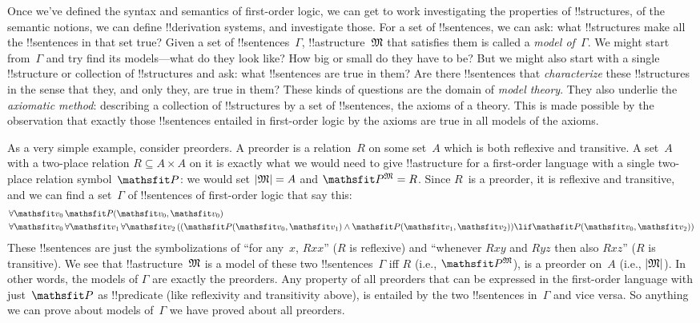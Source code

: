 \documentclass[../../../include/open-logic-section]{subfiles}
\begin{document}


Once we've defined the syntax and semantics of first-order logic, we
can get to work investigating the properties of !!{structure}s, of the
semantic notions, we can define !!{derivation} systems, and investigate those.
For a set of !!{sentence}s, we can ask: what !!{structure}s make all
the !!{sentence}s in that set true?  Given a set of
!!{sentence}s~$\Gamma$, !!a{structure}~$\Struct{M}$ that satisfies
them is called a \emph{model of~$\Gamma$}.  We might start
from~$\Gamma$ and try find its models---what do they look like? How
big or small do they have to be? But we might also start with a single
!!{structure} or collection of !!{structure}s and ask: what
!!{sentence}s are true in them?  Are there !!{sentence}s that
\emph{characterize} these !!{structure}s in the sense that they, and
only they, are true in them? These kinds of questions are the domain
of \emph{model theory}.  They also underlie the \emph{axiomatic
method}: describing a collection of !!{structure}s by a set of
!!{sentence}s, the axioms of a theory. This is made possible by the
observation that exactly those !!{sentence}s entailed in first-order
logic by the axioms are true in all models of the axioms.

As a very simple example, consider preorders. A preorder is a
relation~$R$ on some set~$A$ which is both reflexive and transitive.
A set~$A$ with a two-place relation $R \subseteq A \times A$ on it is
exactly what we would need to give !!a{structure} for a first-order
language with a single two-place relation symbol~$\Obj P$: we would
set $\Domain{M} = A$ and $\Assign{\Obj P}{M} = R$.  Since $R$~is a
preorder, it is reflexive and transitive, and we can find a
set~$\Gamma$ of !!{sentence}s of first-order logic that say this:
\begin{align*}
  & \lforall[\Obj v_0][\Atom{\Obj P}{\Obj v_0,\Obj v_0}]\\
  & \lforall[\Obj v_0][\lforall[\Obj v_1][\lforall[\Obj v_2][((\Atom{\Obj P}{\Obj v_0,\Obj v_1} \land \Atom{\Obj P}{\Obj v_1,\Obj v_2}) \lif \Atom{\Obj P}{\Obj v_0,\Obj v_2})]]]
\end{align*}
These !!{sentence}s are just the symbolizations of ``for any~$x$,
$Rxx$'' ($R$ is reflexive) and ``whenever $Rxy$ and $Ryz$ then also
$Rxz$'' ($R$ is transitive). We see that !!a{structure}~$\Struct{M}$
is a model of these two !!{sentence}s~$\Gamma$ iff $R$ (i.e.,
$\Assign{\Obj P}{M}$), is a preorder on~$A$ (i.e., $\Domain{M}$). In
other words, the models of $\Gamma$ are exactly the preorders. Any
property of all preorders that can be expressed in the first-order
language with just~$\Obj P$ as !!{predicate} (like reflexivity and
transitivity above), is entailed by the two !!{sentence}s in~$\Gamma$
and vice versa.  So anything we can prove about models of~$\Gamma$ we
have proved about all preorders.
\end{document}
